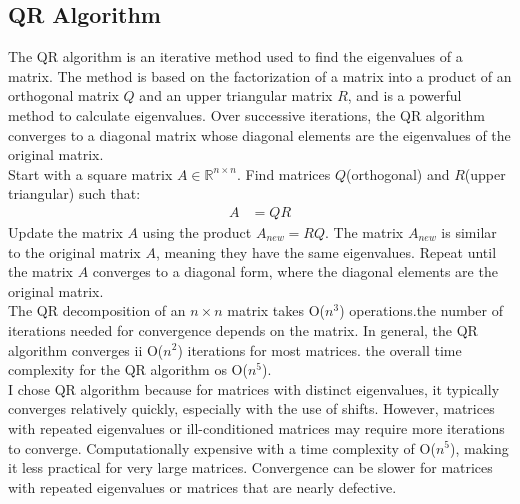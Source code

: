 \documentclass{article}
\begin{document}
\subsection*{QR Algorithm}
The QR algorithm is an iterative method used to find the eigenvalues of a matrix. The method is based on the factorization of a matrix into a product of an orthogonal matrix $Q$ and an upper triangular matrix $R$, and is a powerful method to calculate eigenvalues. Over successive iterations, the QR algorithm converges to a diagonal matrix whose diagonal elements are the eigenvalues of the original matrix.
\\Start with a square matrix $A \in {\mathbb{R}^{n{\times}n}}$. Find matrices $Q$(orthogonal) and $R$(upper triangular) such that:
\begin{align*}
    A&=QR
\end{align*}
Update the matrix $A$ using the product $A_{new}=RQ$. The matrix $A_{new}$ is similar to the original matrix $A$, meaning they have the same eigenvalues. Repeat until the matrix $A$ converges to a diagonal form, where the diagonal elements are the original matrix.
\\The QR decomposition of an $n{\times}n$ matrix takes O($n^3$) operations.the number of iterations needed for convergence depends on the matrix. In general, the QR algorithm converges ii O($n^2$) iterations for most matrices. the overall time complexity for the QR algorithm os O($n^5$).
\\I chose QR algorithm because for matrices with distinct eigenvalues, it typically converges relatively quickly, especially with the use of shifts. However, matrices with repeated eigenvalues or ill-conditioned matrices may require more iterations to converge.
Computationally expensive with a time complexity of O($n^5$), making it less practical for very large matrices. Convergence can be slower for matrices with repeated eigenvalues or matrices that are nearly defective.
\end{document}
